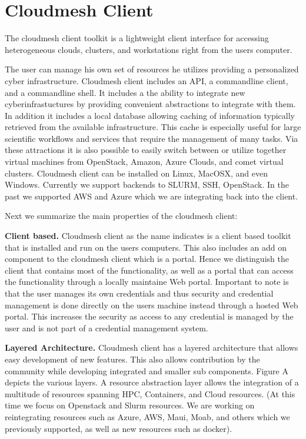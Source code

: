 
\section{Cloudmesh Client}

The cloudmesh client toolkit \cite{www-cloudmesh} is a lightweight
client interface for accessing heterogeneous clouds, clusters, and
workstations right from the users computer. 

The user can manage his own set of resources he utilizes providing a
personalized cyber infrastructure. Cloudmesh client includes an API, a
commandline client, and a commandline shell. It includes a the ability
to integrate new cyberinfrastuctures by providing convenient
abstractions to integrate with them. In addition it includes a local
database allowing caching of information typically retrieved from the
available infrastructure. This cache is especially useful for large
scientific workflows and services that require the management of many
tasks.  Via these attractions it is also possible to easily switch
between or utilize together virtual machines from OpenStack, Amazon,
Azure Clouds, and comet virtual clusters.  Cloudmesh client can be
installed on Linux, MacOSX, and even Windows.  Currently we support
backends to SLURM, SSH, OpenStack. In the past we supported AWS and
Azure which we are integrating back into the client.

Next we summarize the main properties of the cloudmesh client:

{\parindent 0pt \bf Client based.} Cloudmesh client as the name indicates is a client based toolkit that is installed and run on the users computers. This also includes an add on component to the cloudmesh client which is a portal. Hence we distinguish the client that contains most of the functionality, as well as a portal that can access the functionality through a locally maintaine Web portal. Important to note is that the user manages its own credentials and thus security and credential management is done directly on the users machine instead through a hosted Web portal. This increases the security as access to any credential is managed by the user and is not part of a credential management system.

{\parindent 0pt \bf Layered Architecture.} Cloudmesh client has a layered architecture that
allows easy development of new features. This also allows contribution
by the community while developing integrated and smaller sub
components. Figure A depicts the various layers. A resource
abstraction layer allows the integration of a multitude of resources
spanning HPC, Containers, and Cloud resources. (At this time we focus
on Openstack and Slurm resources. We are working on reintegrating
resources such as Azure, AWS, Maui, Moab, and others which we
previously supported, as well as new resources such as docker).

